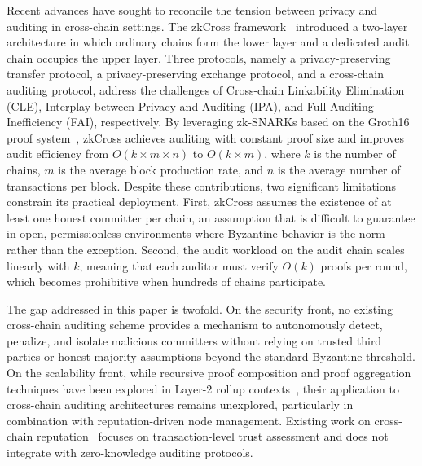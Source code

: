 \documentclass[journal]{IEEEtran}
\begin{document}
Recent advances have sought to reconcile the tension between privacy and auditing in cross-chain settings. The zkCross framework~\cite{guo2024zkcross} introduced a two-layer architecture in which ordinary chains form the lower layer and a dedicated audit chain occupies the upper layer. Three protocols, namely a privacy-preserving transfer protocol, a privacy-preserving exchange protocol, and a cross-chain auditing protocol, address the challenges of Cross-chain Linkability Elimination (CLE), Interplay between Privacy and Auditing (IPA), and Full Auditing Inefficiency (FAI), respectively. By leveraging zk-SNARKs based on the Groth16 proof system~\cite{groth2016size}, zkCross achieves auditing with constant proof size and improves audit efficiency from $O(k \times m \times n)$ to $O(k \times m)$, where $k$ is the number of chains, $m$ is the average block production rate, and $n$ is the average number of transactions per block. Despite these contributions, two significant limitations constrain its practical deployment. First, zkCross assumes the existence of at least one honest committer per chain, an assumption that is difficult to guarantee in open, permissionless environments where Byzantine behavior is the norm rather than the exception. Second, the audit workload on the audit chain scales linearly with $k$, meaning that each auditor must verify $O(k)$ proofs per round, which becomes prohibitive when hundreds of chains participate.

The gap addressed in this paper is twofold. On the security front, no existing cross-chain auditing scheme provides a mechanism to autonomously detect, penalize, and isolate malicious committers without relying on trusted third parties or honest majority assumptions beyond the standard Byzantine threshold. On the scalability front, while recursive proof composition and proof aggregation techniques have been explored in Layer-2 rollup contexts~\cite{rosenberg2024hekaton, xie2022zkbridge}, their application to cross-chain auditing architectures remains unexplored, particularly in combination with reputation-driven node management. Existing work on cross-chain reputation~\cite{hu2024reputation, xiong2025reputation} focuses on transaction-level trust assessment and does not integrate with zero-knowledge auditing protocols.
\end{document}
